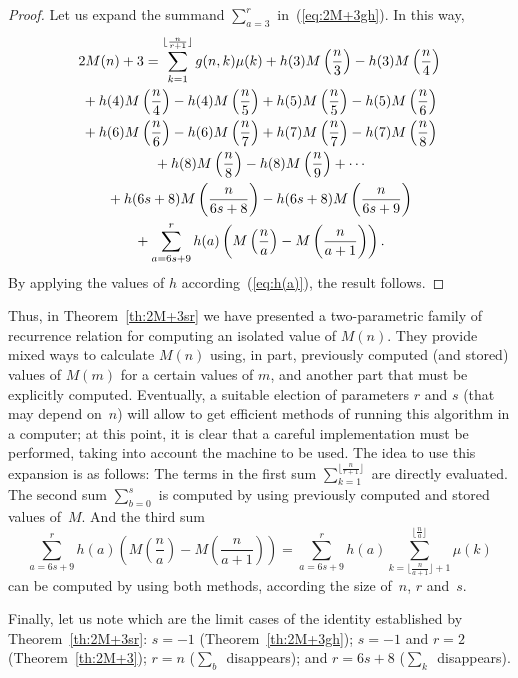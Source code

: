 \documentclass[10pt]{amsart}
\begin{document}
\begin{proof}
Let us expand the summand $\sum_{a=3}^r$ in~(\ref{eq:2M+3gh}). In this way,
\begin{multline*}
2M(n)+3 = \sum_{k=1}^{\lfloor\frac{n}{r+1}\rfloor} g(n,k)\mu(k)
+ h(3)M\left(\frac n3\right) - h(3)M\left(\frac n{4}\right)
\\
\null+ h(4)M\left(\frac n4\right) - h(4)M\left(\frac n{5}\right)
+ h(5)M\left(\frac n5\right) - h(5)M\left(\frac n{6}\right)
\\
\null+ h(6)M\left(\frac n6\right) - h(6)M\left(\frac n{7}\right)
+ h(7)M\left(\frac n7\right) - h(7)M\left(\frac n{8}\right)
\\
\null+ h(8)M\left(\frac n8\right) - h(8)M\left(\frac n{9}\right)
+ \cdots
\\
\null+ h(6s+8)M\left(\frac n{6s+8}\right)
- h(6s+8)M\left(\frac n{6s+9}\right)
\\
\null+ \sum_{a=6s+9}^r h(a)\left(M\left(\frac na\right)
- M\left(\frac n{a+1}\right)\right).
\end{multline*}
By applying the values of $h$ according~(\ref{eq:h(a)}),
the result follows.
\end{proof}

Thus, in Theorem~\ref{th:2M+3sr} we have presented a two-parametric family of
recurrence relation for computing an isolated value of $M(n)$.
They provide mixed ways to calculate $M(n)$ using,
in part, previously computed (and stored) values of $M(m)$ for a
certain values of $m$, and another part that must be explicitly computed.
Eventually, a suitable election of parameters $r$ and $s$ (that may depend on~$n$)
will allow to get efficient methods of running this algorithm in a computer;
at this point, it is clear that a careful implementation must be performed,
taking into account the machine to be used.
%
The idea to use this expansion is as follows: The terms in the first sum
$\sum_{k=1}^{\lfloor\frac{n}{r+1}\rfloor}$ are directly evaluated.
The second sum $\sum_{b=0}^s$ is computed by using previously computed
and stored values of~$M$. And the third sum
$$
\sum_{a=6s+9}^r h(a)\left(M\left(\frac na\right)
- M\left(\frac n{a+1}\right)\right)
= \sum_{a=6s+9}^r h(a) \sum_{k=\lfloor
\frac n{a+1}\rfloor +1}^{\lfloor\frac na\rfloor}\mu(k)
$$
can be computed by using both methods, according the size of~$n$, $r$ and~$s$.

Finally, let us note which are the limit cases of the identity
established by Theorem~\ref{th:2M+3sr}: $s=-1$ (Theorem~\ref{th:2M+3gh});
$s=-1$ and $r=2$ (Theorem~\ref{th:2M+3}); $r=n$ ($\sum_b$~disappears);
and $r=6s+8$ ($\sum_k$~disappears).
\end{document}
